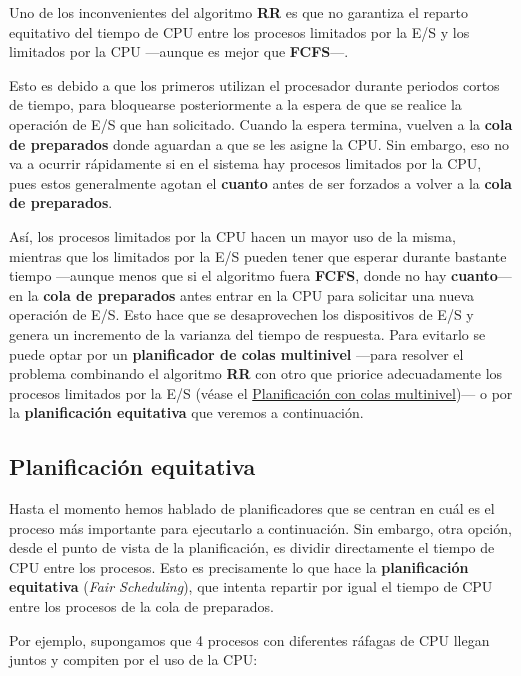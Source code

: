 Uno de los inconvenientes del algoritmo \textbf{RR} es que no garantiza
el reparto equitativo del tiempo de CPU entre los procesos limitados por
la E/S y los limitados por la CPU ---aunque es mejor que
\textbf{FCFS}---.

Esto es debido a que los primeros utilizan el procesador durante
periodos cortos de tiempo, para bloquearse posteriormente a la espera de
que se realice la operación de E/S que han solicitado. Cuando la espera
termina, vuelven a la \textbf{cola de preparados} donde aguardan a que
se les asigne la CPU. Sin embargo, eso no va a ocurrir rápidamente si en
el sistema hay procesos limitados por la CPU, pues estos generalmente
agotan el \textbf{cuanto} antes de ser forzados a volver a la
\textbf{cola de preparados}.

Así, los procesos limitados por la CPU hacen un mayor uso de la misma,
mientras que los limitados por la E/S pueden tener que esperar durante
bastante tiempo ---aunque menos que si el algoritmo fuera \textbf{FCFS},
donde no hay \textbf{cuanto}--- en la \textbf{cola de preparados} antes
entrar en la CPU para solicitar una nueva operación de E/S. Esto hace
que se desaprovechen los dispositivos de E/S y genera un incremento de
la varianza del tiempo de respuesta. Para evitarlo se puede optar por un
\textbf{planificador de colas multinivel} ---para resolver el problema
combinando el algoritmo \textbf{RR} con otro que priorice adecuadamente
los procesos limitados por la E/S (véase el
\hyperref[_planificaciuxf3n_con_colas_multinivel]{Planificación con
colas multinivel})--- o por la \textbf{planificación equitativa} que
veremos a continuación.

\subsection{Planificación
equitativa}\label{_planificaciuxf3n_equitativa}

{} Hasta el momento hemos hablado de planificadores que se centran en
cuál es el proceso más importante para ejecutarlo a continuación. Sin
embargo, otra opción, desde el punto de vista de la planificación, es
dividir directamente el tiempo de CPU entre los procesos. Esto es
precisamente lo que hace la \textbf{planificación equitativa}
(\emph{Fair Scheduling}), que intenta repartir por igual el tiempo de
CPU entre los procesos de la cola de preparados.

Por ejemplo, supongamos que 4 procesos con diferentes ráfagas de CPU
llegan juntos y compiten por el uso de la CPU:

